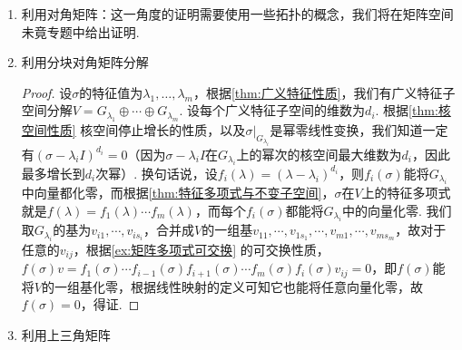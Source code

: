 \begin{enumerate}
    \item 利用对角矩阵：这一角度的证明需要使用一些拓扑的概念，我们将在矩阵空间未竟专题中给出证明.

    \item 利用分块对角矩阵分解

          \begin{proof}
              设$\sigma$的特征值为$\lambda_1,\ldots,\lambda_m$，根据\autoref{thm:广义特征性质}，我们有广义特征子空间分解$V=G_{\lambda_1}\oplus\cdots\oplus G_{\lambda_m}$. 设每个广义特征子空间的维数为$d_i$. 根据\autoref{thm:核空间性质} 核空间停止增长的性质，以及$\sigma\vert_{G_{\lambda_i}}$是幂零线性变换，我们知道一定有$(\sigma-\lambda_iI)^{d_i}=0$（因为$\sigma-\lambda_iI$在$G_{\lambda_i}$上的幂次的核空间最大维数为$d_i$，因此最多增长到$d_i$次幂）. 换句话说，设$f_i(\lambda)=(\lambda-\lambda_i)^{d_i}$，则$f_i(\sigma)$能将$G_{\lambda_i}$中向量都化零，而根据\autoref{thm:特征多项式与不变子空间}，$\sigma$在$V$上的特征多项式就是$f(\lambda)=f_1(\lambda)\cdots f_m(\lambda)$，而每个$f_i(\sigma)$都能将$G_{\lambda_i}$中的向量化零. 我们取$G_{\lambda_i}$的基为$v_{i1},\cdots,v_{is_i}$，合并成$V$的一组基$v_{11},\cdots,v_{1s_1},\cdots,v_{m1},\cdots,v_{ms_m}$，故对于任意的$v_{ij}$，根据\autoref{ex:矩阵多项式可交换} 的可交换性质，$f(\sigma)v=f_1(\sigma)\cdots f_{i-1}(\sigma)f_{i+1}(\sigma)\cdots f_m(\sigma)f_i(\sigma)v_{ij}=0$，即$f(\sigma)$能将$V$的一组基化零，根据线性映射的定义可知它也能将任意向量化零，故$f(\sigma)=0$，得证.
          \end{proof}

    \item 利用上三角矩阵


\end{enumerate}
